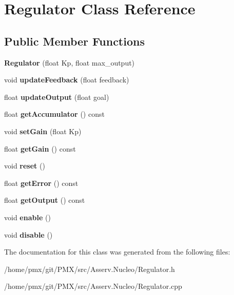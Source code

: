 \hypertarget{classRegulator}{}\section{Regulator Class Reference}
\label{classRegulator}
\subsection*{Public Member Functions}
\begin{DoxyCompactItemize}
\item 
\mbox{\label{classRegulator_acf930df864b786ee1961068ec1d32276}} 
{\bfseries Regulator} (float Kp, float max\+\_\+output)
\item 
\mbox{\label{classRegulator_a9f4f84ea3ec0f3d0e3608937e4f4cba0}} 
void {\bfseries update\+Feedback} (float feedback)
\item 
\mbox{\label{classRegulator_a79ee128072ad578898cce79617cb2c33}} 
float {\bfseries update\+Output} (float goal)
\item 
\mbox{\label{classRegulator_abff3c90abc0259279197d41f67bc55a2}} 
float {\bfseries get\+Accumulator} () const
\item 
\mbox{\label{classRegulator_a6be2bcdce5299f5560ce2cbf2c6b9118}} 
void {\bfseries set\+Gain} (float Kp)
\item 
\mbox{\label{classRegulator_af86a1d0eecc3e688aec13059b1c9a2e2}} 
float {\bfseries get\+Gain} () const
\item 
\mbox{\label{classRegulator_ae34a129592a57f07a974217478e7c52c}} 
void {\bfseries reset} ()
\item 
\mbox{\label{classRegulator_a1b912273fe8e6065437645d423c2b16b}} 
float {\bfseries get\+Error} () const
\item 
\mbox{\label{classRegulator_aec24032fe7a7dcf70bc858adf86090cd}} 
float {\bfseries get\+Output} () const
\item 
\mbox{\label{classRegulator_a833fe212313a5e35ced5e1c540756137}} 
void {\bfseries enable} ()
\item 
\mbox{\label{classRegulator_a48546faf3f334880c6abf0e7177dc0ab}} 
void {\bfseries disable} ()
\end{DoxyCompactItemize}


The documentation for this class was generated from the following files\+:\begin{DoxyCompactItemize}
\item 
/home/pmx/git/\+P\+M\+X/src/\+Asserv.\+Nucleo/Regulator.\+h\item 
/home/pmx/git/\+P\+M\+X/src/\+Asserv.\+Nucleo/Regulator.\+cpp\end{DoxyCompactItemize}
